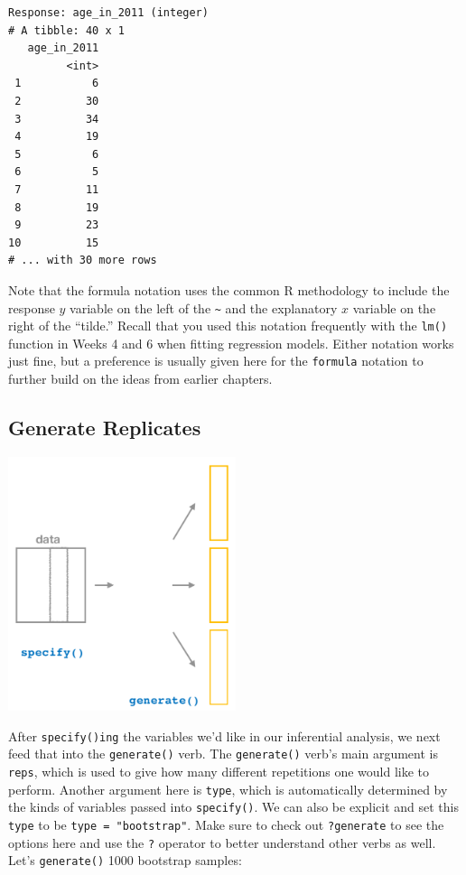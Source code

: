 \documentclass[]{article}
\begin{document}
\begin{verbatim}
Response: age_in_2011 (integer)
# A tibble: 40 x 1
   age_in_2011
         <int>
 1           6
 2          30
 3          34
 4          19
 5           6
 6           5
 7          11
 8          19
 9          23
10          15
# ... with 30 more rows
\end{verbatim}

Note that the formula notation uses the common R methodology to include
the response \(y\) variable on the left of the
\texttt{\textasciitilde{}} and the explanatory \(x\) variable on the
right of the ``tilde.'' Recall that you used this notation frequently
with the \texttt{lm()} function in Weeks 4 and 6 when fitting regression
models. Either notation works just fine, but a preference is usually
given here for the \texttt{formula} notation to further build on the
ideas from earlier chapters.

\subsection{Generate Replicates}\label{generate-replicates}

\begin{center}
\includegraphics[width=0.5\textwidth]{generate.png}
\end{center}

After \texttt{specify()ing} the variables we'd like in our inferential
analysis, we next feed that into the \texttt{generate()} verb. The
\texttt{generate()} verb's main argument is \texttt{reps}, which is used
to give how many different repetitions one would like to perform.
Another argument here is \texttt{type}, which is automatically
determined by the kinds of variables passed into \texttt{specify()}. We
can also be explicit and set this \texttt{type} to be
\texttt{type\ =\ "bootstrap"}. Make sure to check out \texttt{?generate}
to see the options here and use the \texttt{?} operator to better
understand other verbs as well. Let's \texttt{generate()} 1000 bootstrap
samples:
\end{document}
